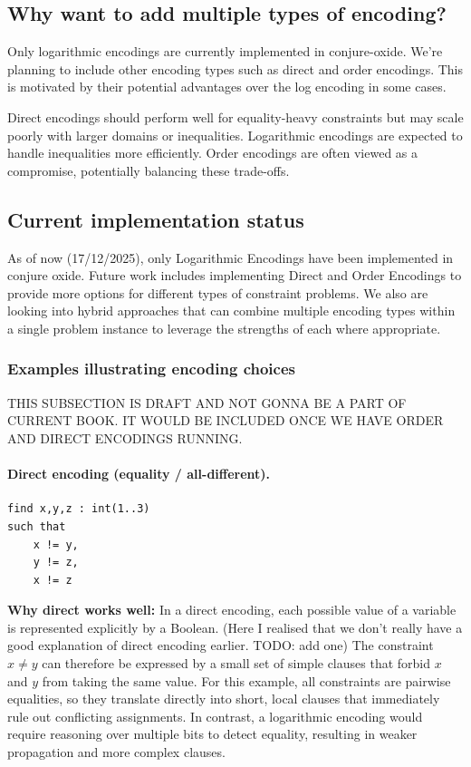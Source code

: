 \subsection{Why want to add multiple types of encoding?}

Only logarithmic encodings are currently implemented in conjure-oxide. We're planning to include other encoding types such as direct and order encodings. This is motivated by their potential advantages over the log encoding in some cases.

Direct encodings should perform well for equality-heavy constraints but may scale poorly with larger domains or inequalities. Logarithmic encodings are expected to handle inequalities more efficiently. Order encodings are often viewed as a compromise, potentially balancing these trade-offs.

\subsection{Current implementation status}

As of now (17/12/2025), only Logarithmic Encodings have been implemented in conjure oxide. Future work includes implementing Direct and Order Encodings to provide more options for different types of constraint problems. We also are looking into hybrid approaches that can combine multiple encoding types within a single problem instance to leverage the strengths of each where appropriate.

\subsubsection{Examples illustrating encoding choices}
THIS SUBSECTION IS DRAFT AND NOT GONNA BE A PART OF CURRENT BOOK. IT WOULD BE INCLUDED ONCE WE HAVE ORDER AND DIRECT ENCODINGS RUNNING.
\paragraph{Direct encoding (equality / all-different).}
\begin{verbatim}
find x,y,z : int(1..3)
such that
    x != y,
    y != z,
    x != z
\end{verbatim}

\noindent
\textbf{Why direct works well:}
In a direct encoding, each possible value of a variable is represented explicitly by a Boolean. 
(Here I realised that we don't really have a good explanation of direct encoding earlier. TODO: add one)
The constraint $x \neq y$ can therefore be expressed by a small set of simple clauses that forbid
$x$ and $y$ from taking the same value.
For this example, all constraints are pairwise equalities, so they translate directly into short, local clauses that immediately rule out conflicting assignments.
In contrast, a logarithmic encoding would require reasoning over multiple bits to detect equality,
resulting in weaker propagation and more complex clauses.

